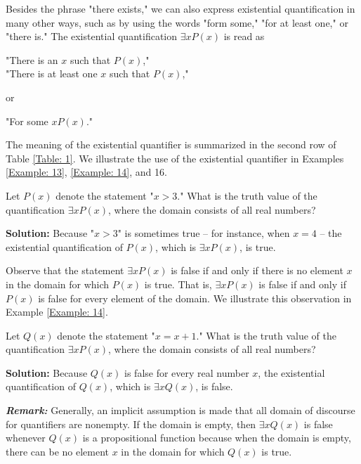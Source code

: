 \documentclass{Axon}
\begin{document}
Besides the phrase "there exists," we can also express existential quantification in many other ways, such as by using the words "form some," "for at least one," or "there is." The existential quantification \(\exists x P(x)\) is read as

\begin{center}
    "There is an \(x\) such that \(P(x)\),"\\
    "There is at least one \(x\) such that \(P(x)\),"
\end{center}

or

\begin{center}
    "For some \(x P(x)\)."
\end{center}

The meaning of the existential quantifier is summarized in the second row of Table \ref{Table: 1}. We illustrate the use of the existential quantifier in Examples \ref{Example: 13}, \ref{Example: 14}, and 16.

\begin{example}\label{Example: 13}
    Let \(P(x)\) denote the statement "\(x > 3\)." What is the truth value of the quantification \(\exists x P(x)\), where the domain consists of all real numbers?

    \noindent
    \textbf{Solution:}
    Because "\(x > 3\)" is sometimes true – for instance, when \(x = 4\) – the existential quantification of \(P(x)\), which is \(\exists x P(x)\), is true.
\end{example}

Observe that the statement \(\exists x P(x)\) is false if and only if there is no element \(x\) in the domain for which \(P(x)\) is true. That is, \(\exists x P(x)\) is false if and only if \(P(x)\) is false for every element of the domain. We illustrate this observation in Example \ref{Example: 14}.

\begin{example}\label{Example: 14}
    Let \(Q(x)\) denote the statement "\(x = x + 1\)." What is the truth value of the quantification \(\exists x P(x)\), where the domain consists of all real numbers?

    \noindent
    \textbf{Solution:}
    Because \(Q(x)\) is false for every real number \(x\), the existential quantification of \(Q(x)\), which is \(\exists x Q(x)\), is false.
\end{example}

\textbf{\textit{Remark:}} Generally, an implicit assumption is made that all domain of discourse for quantifiers are nonempty. If the domain is empty, then \(\exists x Q(x)\) is false whenever \(Q(x)\) is a propositional function because when the domain is empty, there can be no element \(x\) in the domain for which \(Q(x)\) is true.
\end{document}
